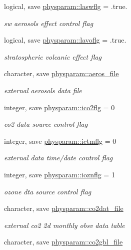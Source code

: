\begin{DoxyCompactItemize}
logical, save \hyperlink{namespacephysparam_aed1b9ce25d416e9149353f2075030bfa}{physparam\+::laswflg} = .true.
\begin{DoxyCompactList}\small\item\em sw aerosols effect control flag \end{DoxyCompactList}\item 
logical, save \hyperlink{namespacephysparam_a70a2b7af2c7f6f631ef05cb05ba6eb8c}{physparam\+::lavoflg} = .true.
\begin{DoxyCompactList}\small\item\em stratospheric volcanic effect flag \end{DoxyCompactList}\item 
character, save \hyperlink{namespacephysparam_a21ceb784a896e6e88dc552786b1c4232}{physparam\+::aeros\+\_\+file}
\begin{DoxyCompactList}\small\item\em external aerosols data file \end{DoxyCompactList}\item 
integer, save \hyperlink{namespacephysparam_a61baf693e83ac6144d86fb8213d39a79}{physparam\+::ico2flg} = 0
\begin{DoxyCompactList}\small\item\em co2 data source control flag \end{DoxyCompactList}\item 
integer, save \hyperlink{namespacephysparam_a4eef5ac5e5b83526d5da7de493cfe73d}{physparam\+::ictmflg} = 0
\begin{DoxyCompactList}\small\item\em external data time/date control flag \end{DoxyCompactList}\item 
integer, save \hyperlink{namespacephysparam_a90d63a1a0c04479f586ce21df72d36b7}{physparam\+::ioznflg} = 1
\begin{DoxyCompactList}\small\item\em ozone dta source control flag \end{DoxyCompactList}\item 
character, save \hyperlink{namespacephysparam_abed249e396bbc5c096408db58b5104c0}{physparam\+::co2dat\+\_\+file}
\begin{DoxyCompactList}\small\item\em external co2 2d monthly obsv data table \end{DoxyCompactList}\item 
character, save \hyperlink{namespacephysparam_ad3e0f053cd067945bdc816b1a81a859a}{physparam\+::co2gbl\+\_\+file}

\end{DoxyCompactItemize}
